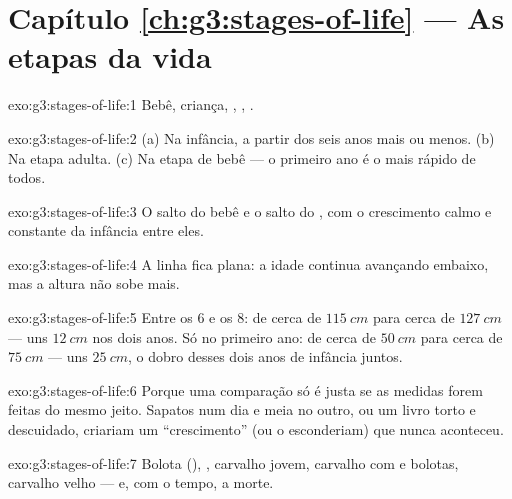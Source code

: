 \section*{Capítulo \ref{ch:g3:stages-of-life} --- As etapas da vida}

\begin{solution}{exo:g3:stages-of-life:1}
Bebê, criança, , , .
\end{solution}

\begin{solution}{exo:g3:stages-of-life:2}
(a) Na infância, a partir dos seis anos mais ou menos. (b) Na etapa
adulta. (c) Na etapa de bebê --- o primeiro ano é o mais rápido de
todos.
\end{solution}

\begin{solution}{exo:g3:stages-of-life:3}
O salto do bebê e o salto do , com o crescimento calmo e
constante da infância entre eles.
\end{solution}

\begin{solution}{exo:g3:stages-of-life:4}
A linha fica plana: a idade continua avançando embaixo, mas a altura
não sobe mais.
\end{solution}

\begin{solution}{exo:g3:stages-of-life:5}
Entre os $6$ e os $8$: de cerca de $\qty{115}{cm}$ para cerca de
$\qty{127}{cm}$ --- uns $\qty{12}{cm}$ nos dois anos. Só no primeiro
ano: de cerca de $\qty{50}{cm}$ para cerca de $\qty{75}{cm}$ --- uns
$\qty{25}{cm}$, o dobro desses dois anos de infância juntos.
\end{solution}

\begin{solution}{exo:g3:stages-of-life:6}
Porque uma comparação só é justa se as medidas forem feitas do mesmo
jeito. Sapatos num dia e meia no outro, ou um livro torto e
descuidado, criariam um ``crescimento'' (ou o esconderiam) que nunca
aconteceu.
\end{solution}

\begin{solution}{exo:g3:stages-of-life:7}
Bolota (), , carvalho jovem, carvalho  com
 e bolotas, carvalho velho --- e, com o tempo, a morte.
\end{solution}

